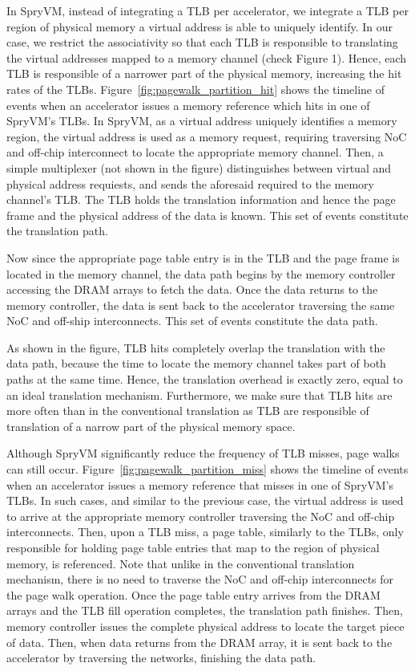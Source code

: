 In SpryVM, instead of integrating a TLB per accelerator, we integrate
a TLB per region of physical memory a virtual address is able to
uniquely identify. In our case, we restrict the associativity so that
each TLB is responsible to translating the virtual addresses mapped to
a memory channel (check Figure 1). Hence, each TLB is responsible of a
narrower part of the physical memory, increasing the hit rates of the
TLBs. Figure~\ref{fig:pagewalk_partition_hit} shows the timeline of
events when an accelerator issues a memory reference which hits in one
of SpryVM's TLBs. In SpryVM, as a virtual address uniquely identifies
a memory region, the virtual address is used as a memory request,
requiring traversing NoC and off-chip interconnect to locate the
appropriate memory channel. Then, a simple multiplexer (not shown in
the figure) distinguishes between virtual and physical address
requiests, and sends the aforesaid required to the memory channel's
TLB. The TLB holds the translation information and hence the page
frame and the physical address of the data is known. This set of
events constitute the translation path.

Now since the appropriate page table entry is in the TLB and the page frame is located in the memory channel, the data path begins by the memory controller accessing the DRAM arrays to fetch the data. Once the data returns to the memory controller, the data is sent back to the accelerator traversing the same NoC and off-ship interconnects. This set of events constitute the data path.

As shown in the figure, TLB hits completely overlap the translation with the data path, because the time to locate the memory channel takes part of both paths at the same time. Hence, the translation overhead is exactly zero, equal to an ideal translation mechanism. Furthermore, we make sure that TLB hits are more often than in the conventional translation as TLB are responsible of translation of a narrow part of the physical memory space.

Although SpryVM significantly reduce the frequency of TLB misses, page walks can still occur. Figure~\ref{fig:pagewalk_partition_miss} shows the timeline of events when an accelerator issues a memory reference that misses in one of SpryVM's TLBs. In such cases, and similar to the previous case, the virtual address is used to arrive at the appropriate memory controller traversing the NoC and off-chip interconnects. Then, upon a TLB miss, a page table, similarly to the TLBs, only responsible for holding page table entries that map to the region of physical memory, is referenced. Note that unlike in the conventional translation mechanism, there is no need to traverse the NoC and off-chip interconnects for the page walk operation. Once the page table entry arrives from the DRAM arrays and the TLB fill operation completes, the translation path finishes. Then, memory controller issues the complete physical address to locate the target piece of data. Then, when data returns from the DRAM array, it is sent back to the accelerator by traversing the networks, finishing the data path.

